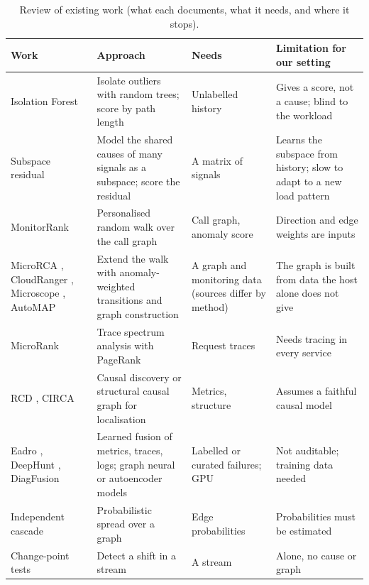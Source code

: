 \begin{table}[!htbp]
\centering
\caption{Review of existing work (what each documents, what it needs, and where it stops).}
\label{tab:litreview}
\small
\renewcommand{\arraystretch}{1.25}
\begin{tabularx}{\textwidth}{>{\raggedright\arraybackslash}p{2.5cm}>{\raggedright\arraybackslash}X>{\raggedright\arraybackslash}p{3.1cm}>{\raggedright\arraybackslash}p{3.3cm}}
\toprule
\textbf{Work} & \textbf{Approach} & \textbf{Needs} & \textbf{Limitation for our setting}\\
\midrule
Isolation Forest \cite{liu2008isolation} & Isolate outliers with random trees; score by path length & Unlabelled history & Gives a score, not a cause; blind to the workload\\
Subspace residual \cite{lakhina2004diagnosing} & Model the shared causes of many signals as a subspace; score the residual & A matrix of signals & Learns the subspace from history; slow to adapt to a new load pattern\\
MonitorRank \cite{kim2013monitorrank} & Personalised random walk over the call graph & Call graph, anomaly score & Direction and edge weights are inputs\\
MicroRCA \cite{wu2020microrca}, CloudRanger \cite{wang2018cloudranger}, Microscope \cite{lin2018microscope}, AutoMAP \cite{ma2020automap} & Extend the walk with anomaly-weighted transitions and graph construction & A graph and monitoring data (sources differ by method) & The graph is built from data the host alone does not give\\
MicroRank \cite{yu2021microrank} & Trace spectrum analysis with PageRank & Request traces & Needs tracing in every service\\
RCD \cite{ikram2022rcd}, CIRCA \cite{li2022circa} & Causal discovery or structural causal graph for localisation & Metrics, structure & Assumes a faithful causal model\\
Eadro \cite{lee2023eadro}, DeepHunt \cite{sun2024deephunt}, DiagFusion \cite{zhang2023diagfusion} & Learned fusion of metrics, traces, logs; graph neural or autoencoder models & Labelled or curated failures; GPU & Not auditable; training data needed\\
Independent cascade \cite{kempe2003influence} & Probabilistic spread over a graph & Edge probabilities & Probabilities must be estimated\\
Change-point tests \cite{page1954cusum,adams2007bocpd} & Detect a shift in a stream & A stream & Alone, no cause or graph\\
\bottomrule
\end{tabularx}
\end{table}

